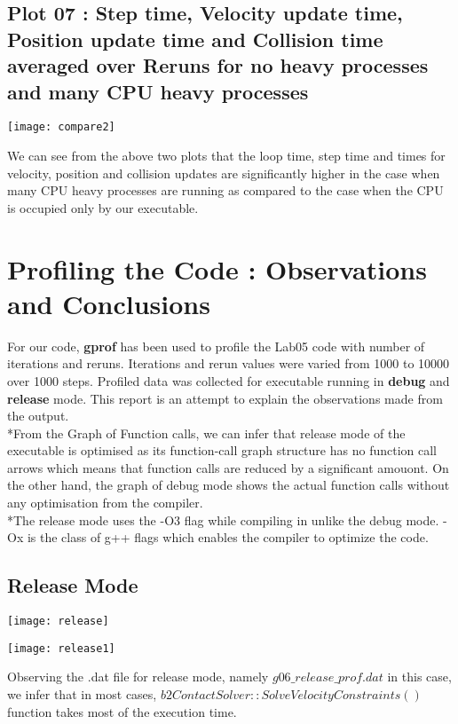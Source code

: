 \documentclass[10pt]{article}
\begin{document}
\subsection{Plot 07 : Step time, Velocity update time, Position update time and Collision time averaged over Reruns for no heavy processes and many CPU heavy processes}
\begin{center}
\texttt{[image: compare2]}
\end{center}
We can see from the above two plots that the loop time, step time and times for velocity, position and collision updates are significantly higher in the case when many CPU heavy processes are running as compared to the case when the CPU is occupied only by our executable.
\section{Profiling the Code : Observations and Conclusions}
For our code, \textbf{gprof} has been used to profile the Lab05 code with number of iterations and reruns. Iterations and rerun values were varied from 1000 to 10000 over 1000 steps. Profiled data was collected for executable running in \textbf{debug} and \textbf{release} mode. This report is an attempt to explain the observations made from the output.
\\*From the Graph of Function calls, we can infer that release mode of the executable is optimised as its function-call graph structure has no function call arrows which means that function calls are reduced by a significant amouont. On the other hand, the graph of debug mode shows the actual function calls without any optimisation from the compiler.
\\*The release mode uses the -O3 flag while compiling in unlike the debug mode. -Ox is the class of g++ flags which enables the compiler to optimize the code. 

\subsection{Release Mode}
\texttt{[image: release]}
\begin{center}
\texttt{[image: release1]}
\end{center}
Observing the .dat file for release mode, namely $g06\_release\_prof.dat$ in this case, we infer that in most cases, $b2ContactSolver::SolveVelocityConstraints()$ function takes most of the execution time.
\end{document}
